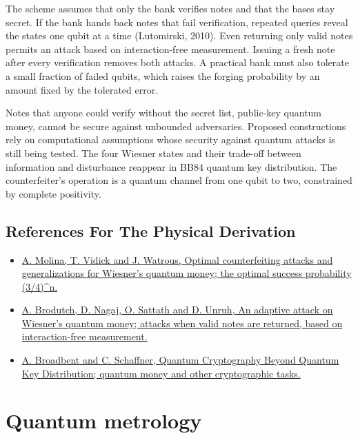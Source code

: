 \documentclass[11pt,oneside]{book}
\begin{document}
The scheme assumes that only the bank verifies notes and that the bases stay secret. If the bank hands back notes that fail verification, repeated queries reveal the states one qubit at a time (Lutomirski, 2010). Even returning only valid notes permits an attack based on interaction-free measurement. Issuing a fresh note after every verification removes both attacks. A practical bank must also tolerate a small fraction of failed qubits, which raises the forging probability by an amount fixed by the tolerated error.

Notes that anyone could verify without the secret list, public-key quantum money, cannot be secure against unbounded adversaries. Proposed constructions rely on computational assumptions whose security against quantum attacks is still being tested. The four Wiesner states and their trade-off between information and disturbance reappear in BB84 quantum key distribution. The counterfeiter's operation is a quantum channel from one qubit to two, constrained by complete positivity.

\subsection*{References For The Physical Derivation}
\begin{itemize}
\item \href{https://arxiv.org/abs/1202.4010}{A. Molina, T. Vidick and J. Watrous, Optimal counterfeiting attacks and generalizations for Wiesner's quantum money; the optimal success probability (3/4)\textasciicircum{}n.}
\item \href{https://arxiv.org/abs/1404.1507}{A. Brodutch, D. Nagaj, O. Sattath and D. Unruh, An adaptive attack on Wiesner's quantum money; attacks when valid notes are returned, based on interaction-free measurement.}
\item \href{https://arxiv.org/abs/1510.06120}{A. Broadbent and C. Schaffner, Quantum Cryptography Beyond Quantum Key Distribution; quantum money and other cryptographic tasks.}
\end{itemize}





\clearpage

\section{Quantum metrology}

\label{topic:quantum-metrology}
\end{document}
